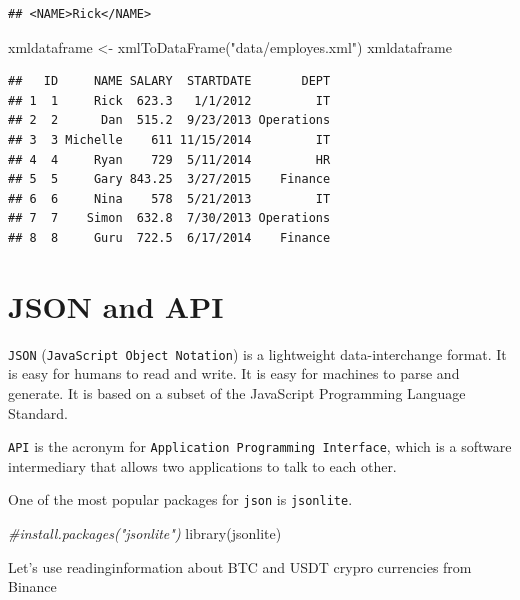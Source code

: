 \documentclass[
]{book}
\newenvironment{Shaded}{\begin{snugshade}}{\end{snugshade}}
\newcommand{\CommentTok}[1]{\textcolor[rgb]{0.56,0.35,0.01}{\textit{#1}}}
\newcommand{\FunctionTok}[1]{\textcolor[rgb]{0.00,0.00,0.00}{#1}}
\newcommand{\NormalTok}[1]{#1}
\newcommand{\OtherTok}[1]{\textcolor[rgb]{0.56,0.35,0.01}{#1}}
\newcommand{\StringTok}[1]{\textcolor[rgb]{0.31,0.60,0.02}{#1}}
\begin{document}
\begin{verbatim}
## <NAME>Rick</NAME>
\end{verbatim}

\begin{Shaded}
\begin{Highlighting}[]
\NormalTok{xmldataframe }\OtherTok{\textless{}{-}} \FunctionTok{xmlToDataFrame}\NormalTok{(}\StringTok{"data/employes.xml"}\NormalTok{)}
\NormalTok{xmldataframe}
\end{Highlighting}
\end{Shaded}

\begin{verbatim}
##   ID     NAME SALARY  STARTDATE       DEPT
## 1  1     Rick  623.3   1/1/2012         IT
## 2  2      Dan  515.2  9/23/2013 Operations
## 3  3 Michelle    611 11/15/2014         IT
## 4  4     Ryan    729  5/11/2014         HR
## 5  5     Gary 843.25  3/27/2015    Finance
## 6  6     Nina    578  5/21/2013         IT
## 7  7    Simon  632.8  7/30/2013 Operations
## 8  8     Guru  722.5  6/17/2014    Finance
\end{verbatim}

\hypertarget{chapter46}{%
\section{JSON and API}\label{chapter46}}

\texttt{JSON} (\texttt{JavaScript\ Object\ Notation}) is a lightweight data-interchange format. It is easy for humans to read and write. It is easy for machines to parse and generate. It is based on a subset of the JavaScript Programming Language Standard.

\texttt{API} is the acronym for \texttt{Application\ Programming\ Interface}, which is a software intermediary that allows two applications to talk to each other.

One of the most popular packages for \texttt{json} is \texttt{jsonlite}.

\begin{Shaded}
\begin{Highlighting}[]
\CommentTok{\#install.packages("jsonlite")}
\FunctionTok{library}\NormalTok{(jsonlite)}
\end{Highlighting}
\end{Shaded}

Let's use readinginformation about BTC and USDT crypro currencies from Binance
\end{document}
